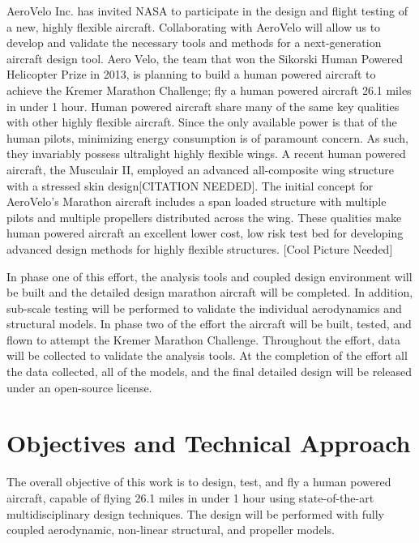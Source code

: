 \documentclass[]{aiaa-tc}
\begin{document}
    AeroVelo Inc. has invited NASA to participate in the design and flight testing of a new, highly flexible aircraft. 
    Collaborating with AeroVelo will allow us to develop and validate the necessary tools and methods for a 
    next-generation aircraft design tool. Aero Velo, the team that won the Sikorski Human Powered Helicopter Prize in 2013, 
    is planning to build a human powered aircraft to achieve the Kremer Marathon Challenge; fly a human 
    powered aircraft 26.1 miles in under 1 hour. Human powered aircraft share many of the same key qualities 
    with other highly flexible aircraft. Since the only available power is that of the human pilots, minimizing 
    energy consumption is of paramount concern. As such, they invariably possess ultralight highly flexible wings. 
    A recent human powered aircraft, the Musculair II, employed an advanced all-composite wing structure 
    with a stressed skin design[CITATION NEEDED]. The initial concept for AeroVelo's Marathon aircraft includes 
    a span loaded structure with multiple pilots and multiple propellers distributed across the wing. These qualities 
    make human powered aircraft an excellent lower cost, low risk test bed for developing advanced design methods 
    for highly flexible structures. [Cool Picture Needed]

    In phase one of this effort, the analysis tools and coupled design environment will be built and 
    the detailed design marathon aircraft will be completed. In addition, sub-scale testing will be 
    performed to validate the individual aerodynamics and structural models. In phase two of the effort
    the aircraft will be built, tested, and flown to attempt the Kremer Marathon Challenge. Throughout 
    the effort, data will be collected to validate the analysis tools. At the completion of the effort 
    all the data collected, all of the models, and the final detailed design will be released under 
    an open-source license.

  \section{Objectives and Technical Approach}

    The overall objective of this work is to design, test, and fly a human powered aircraft, 
    capable of flying 26.1 miles in under 1 hour using state-of-the-art multidisciplinary 
    design techniques. The design will be performed with fully coupled
    aerodynamic, non-linear structural, and propeller models. 
\end{document}
